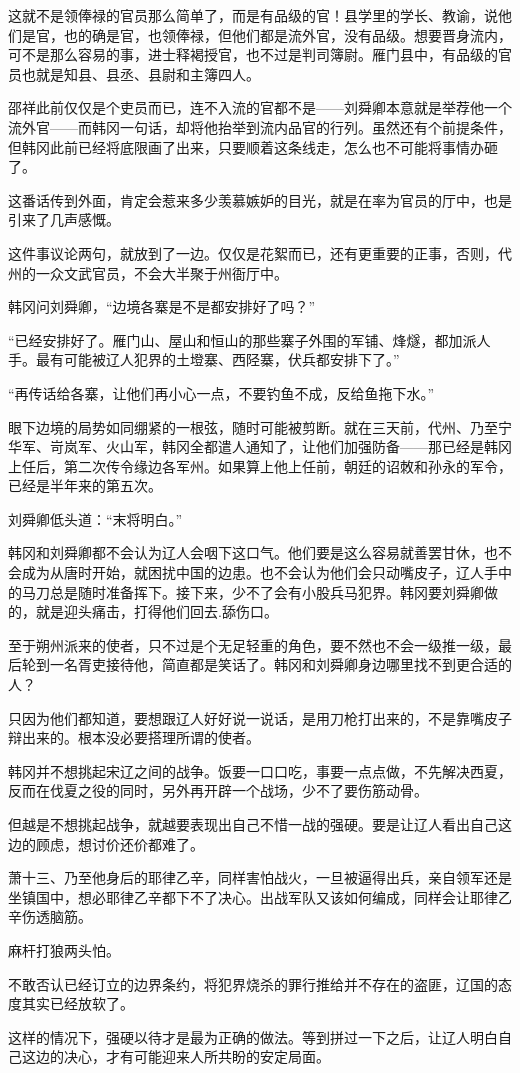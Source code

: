 这就不是领俸禄的官员那么简单了，而是有品级的官！县学里的学长、教谕，说他们是官，也的确是官，也领俸禄，但他们都是流外官，没有品级。想要晋身流内，可不是那么容易的事，进士释褐授官，也不过是判司簿尉。雁门县中，有品级的官员也就是知县、县丞、县尉和主簿四人。

邵祥此前仅仅是个吏员而已，连不入流的官都不是——刘舜卿本意就是举荐他一个流外官——而韩冈一句话，却将他抬举到流内品官的行列。虽然还有个前提条件，但韩冈此前已经将底限画了出来，只要顺着这条线走，怎么也不可能将事情办砸了。

这番话传到外面，肯定会惹来多少羡慕嫉妒的目光，就是在率为官员的厅中，也是引来了几声感慨。

这件事议论两句，就放到了一边。仅仅是花絮而已，还有更重要的正事，否则，代州的一众文武官员，不会大半聚于州衙厅中。

韩冈问刘舜卿，“边境各寨是不是都安排好了吗？”

“已经安排好了。雁门山、屋山和恒山的那些寨子外围的军铺、烽燧，都加派人手。最有可能被辽人犯界的土墱寨、西陉寨，伏兵都安排下了。”

“再传话给各寨，让他们再小心一点，不要钓鱼不成，反给鱼拖下水。”

眼下边境的局势如同绷紧的一根弦，随时可能被剪断。就在三天前，代州、乃至宁华军、岢岚军、火山军，韩冈全都遣人通知了，让他们加强防备——那已经是韩冈上任后，第二次传令缘边各军州。如果算上他上任前，朝廷的诏敇和孙永的军令，已经是半年来的第五次。

刘舜卿低头道：“末将明白。”

韩冈和刘舜卿都不会认为辽人会咽下这口气。他们要是这么容易就善罢甘休，也不会成为从唐时开始，就困扰中国的边患。也不会认为他们会只动嘴皮子，辽人手中的马刀总是随时准备挥下。接下来，少不了会有小股兵马犯界。韩冈要刘舜卿做的，就是迎头痛击，打得他们回去.舔伤口。

至于朔州派来的使者，只不过是个无足轻重的角色，要不然也不会一级推一级，最后轮到一名胥吏接待他，简直都是笑话了。韩冈和刘舜卿身边哪里找不到更合适的人？

只因为他们都知道，要想跟辽人好好说一说话，是用刀枪打出来的，不是靠嘴皮子辩出来的。根本没必要搭理所谓的使者。

韩冈并不想挑起宋辽之间的战争。饭要一口口吃，事要一点点做，不先解决西夏，反而在伐夏之役的同时，另外再开辟一个战场，少不了要伤筋动骨。

但越是不想挑起战争，就越要表现出自己不惜一战的强硬。要是让辽人看出自己这边的顾虑，想讨价还价都难了。

萧十三、乃至他身后的耶律乙辛，同样害怕战火，一旦被逼得出兵，亲自领军还是坐镇国中，想必耶律乙辛都下不了决心。出战军队又该如何编成，同样会让耶律乙辛伤透脑筋。

麻杆打狼两头怕。

不敢否认已经订立的边界条约，将犯界烧杀的罪行推给并不存在的盗匪，辽国的态度其实已经放软了。

这样的情况下，强硬以待才是最为正确的做法。等到拼过一下之后，让辽人明白自己这边的决心，才有可能迎来人所共盼的安定局面。

